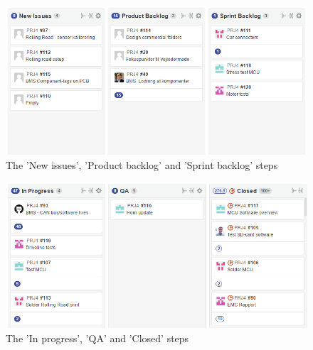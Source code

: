 \begin{figure}
	\centering
	\includegraphics[width=0.7\linewidth]{SubPages/Images/Zenhub1}
	\caption{The 'New issues', 'Product backlog' and 'Sprint backlog' steps}
	\label{fig:Zenhub1}
\end{figure}

\begin{figure}
	\centering
	\includegraphics[width=0.7\linewidth]{SubPages/Images/Zenhub2}
	\caption{The 'In progress', 'QA' and 'Closed' steps}
	\label{fig:Zenhub2}
\end{figure}
